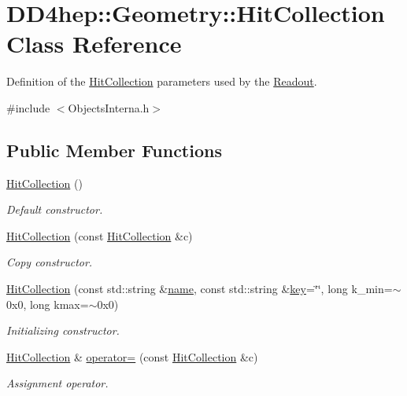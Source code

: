 \hypertarget{class_d_d4hep_1_1_geometry_1_1_hit_collection}{
\section{DD4hep::Geometry::HitCollection Class Reference}
\label{class_d_d4hep_1_1_geometry_1_1_hit_collection}
}


Definition of the \hyperlink{class_d_d4hep_1_1_geometry_1_1_hit_collection}{HitCollection} parameters used by the \hyperlink{class_d_d4hep_1_1_geometry_1_1_readout}{Readout}.  


{\ttfamily \#include $<$ObjectsInterna.h$>$}\subsection*{Public Member Functions}
\begin{DoxyCompactItemize}
\item 
\hyperlink{class_d_d4hep_1_1_geometry_1_1_hit_collection_aede87fea1d9371d8d8459645dea6a663}{HitCollection} ()
\begin{DoxyCompactList}\small\item\em Default constructor. \item\end{DoxyCompactList}\item 
\hyperlink{class_d_d4hep_1_1_geometry_1_1_hit_collection_a4caf6de6f5c18ee344c1d380fecd66ba}{HitCollection} (const \hyperlink{class_d_d4hep_1_1_geometry_1_1_hit_collection}{HitCollection} \&c)
\begin{DoxyCompactList}\small\item\em Copy constructor. \item\end{DoxyCompactList}\item 
\hyperlink{class_d_d4hep_1_1_geometry_1_1_hit_collection_a94ca1d5d60e6c588bd20a0da61a1d969}{HitCollection} (const std::string \&\hyperlink{class_d_d4hep_1_1_geometry_1_1_hit_collection_a9c9a772a612f38f6104fd976f8b20ba0}{name}, const std::string \&\hyperlink{class_d_d4hep_1_1_geometry_1_1_hit_collection_a4948f37ecd677f966101a2d662412790}{key}=\char`\"{}\char`\"{}, long k\_\-min=$\sim$0x0, long kmax=$\sim$0x0)
\begin{DoxyCompactList}\small\item\em Initializing constructor. \item\end{DoxyCompactList}\item 
\hyperlink{class_d_d4hep_1_1_geometry_1_1_hit_collection}{HitCollection} \& \hyperlink{class_d_d4hep_1_1_geometry_1_1_hit_collection_aaa94ed4af290c075c5e6c8fd553bb84c}{operator=} (const \hyperlink{class_d_d4hep_1_1_geometry_1_1_hit_collection}{HitCollection} \&c)
\begin{DoxyCompactList}\small\item\em Assignment operator. \item\end{DoxyCompactList}\end{DoxyCompactItemize}
